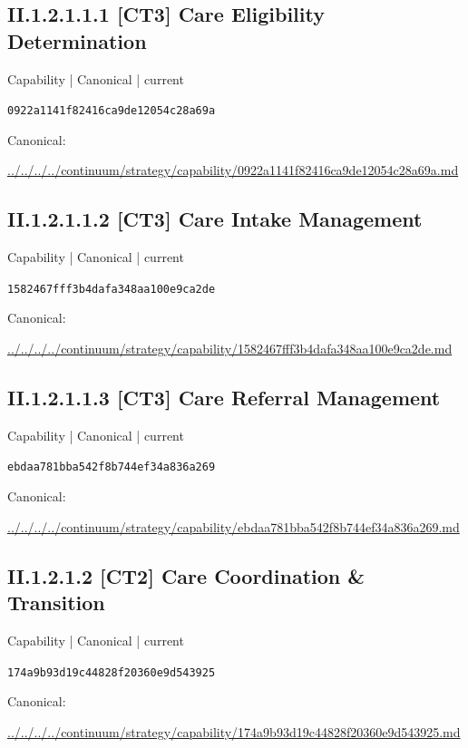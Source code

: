 \documentclass[10pt,a4paper]{article}
\begin{document}
\subsection*{II.1.2.1.1.1 [CT3] Care Eligibility Determination}
\label{element-0922a1141f82416ca9de12054c28a69a}
{\small Capability | Canonical | current}\par
\texttt{0922a1141f82416ca9de12054c28a69a}\par
Canonical: \par
{\footnotesize\url{../../../../continuum/strategy/capability/0922a1141f82416ca9de12054c28a69a.md}}\par
\subsection*{II.1.2.1.1.2 [CT3] Care Intake Management}
\label{element-1582467fff3b4dafa348aa100e9ca2de}
{\small Capability | Canonical | current}\par
\texttt{1582467fff3b4dafa348aa100e9ca2de}\par
Canonical: \par
{\footnotesize\url{../../../../continuum/strategy/capability/1582467fff3b4dafa348aa100e9ca2de.md}}\par
\subsection*{II.1.2.1.1.3 [CT3] Care Referral Management}
\label{element-ebdaa781bba542f8b744ef34a836a269}
{\small Capability | Canonical | current}\par
\texttt{ebdaa781bba542f8b744ef34a836a269}\par
Canonical: \par
{\footnotesize\url{../../../../continuum/strategy/capability/ebdaa781bba542f8b744ef34a836a269.md}}\par
\subsection*{II.1.2.1.2 [CT2] Care Coordination \& Transition}
\label{element-174a9b93d19c44828f20360e9d543925}
{\small Capability | Canonical | current}\par
\texttt{174a9b93d19c44828f20360e9d543925}\par
Canonical: \par
{\footnotesize\url{../../../../continuum/strategy/capability/174a9b93d19c44828f20360e9d543925.md}}\par
\end{document}
